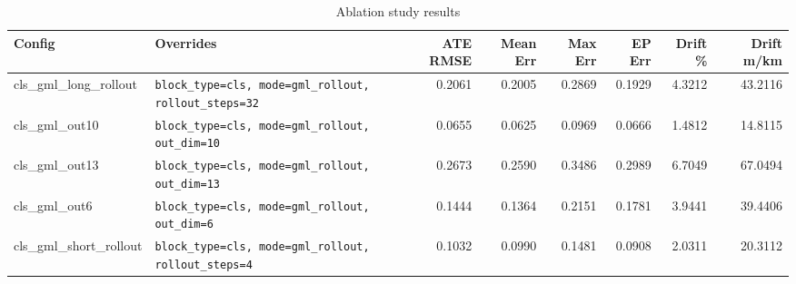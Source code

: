 \begin{table}[ht]
\centering
\caption{Ablation study results}
\label{tab:ablation}
\small
\setlength{\tabcolsep}{4pt}
\begin{tabular}{ll rr rr rr}
\toprule
\textbf{Config} & \textbf{Overrides} &
\textbf{ATE RMSE} & \textbf{Mean Err} &
\textbf{Max Err} & \textbf{EP Err} &
\textbf{Drift \%} & \textbf{Drift m/km} \\
\midrule
cls\_gml\_long\_rollout & \texttt{block\_type=cls, mode=gml\_rollout, rollout\_steps=32} & 0.2061 & 0.2005 & 0.2869 & 0.1929 & 4.3212 & 43.2116 \\
cls\_gml\_out10 & \texttt{block\_type=cls, mode=gml\_rollout, out\_dim=10} & 0.0655 & 0.0625 & 0.0969 & 0.0666 & 1.4812 & 14.8115 \\
cls\_gml\_out13 & \texttt{block\_type=cls, mode=gml\_rollout, out\_dim=13} & 0.2673 & 0.2590 & 0.3486 & 0.2989 & 6.7049 & 67.0494 \\
cls\_gml\_out6 & \texttt{block\_type=cls, mode=gml\_rollout, out\_dim=6} & 0.1444 & 0.1364 & 0.2151 & 0.1781 & 3.9441 & 39.4406 \\
cls\_gml\_short\_rollout & \texttt{block\_type=cls, mode=gml\_rollout, rollout\_steps=4} & 0.1032 & 0.0990 & 0.1481 & 0.0908 & 2.0311 & 20.3112 \\
\bottomrule
\end{tabular}
\end{table}

